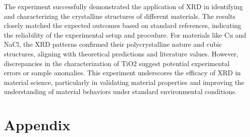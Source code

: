 \documentclass[11pt]{article}
\begin{document}
	The experiment successfully demonstrated the application of XRD in identifying and characterizing the crystalline structures of different materials. The results closely matched the expected outcomes based on standard references, indicating the reliability of the experimental setup and procedure. For materials like Cu and NaCl, the XRD patterns confirmed their polycrystalline nature and cubic structures, aligning with theoretical predictions and literature values. However, discrepancies in the characterization of TiO2 suggest potential experimental errors or sample anomalies. This experiment underscores the efficacy of XRD in material science, particularly in validating material properties and improving the understanding of material behaviors under standard environmental conditions.
		
\clearpage
	
	\section{Appendix}	
	
\end{document}
